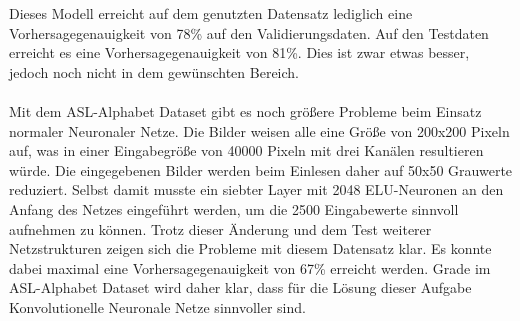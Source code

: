 \documentclass[11pt,bibliography=totocnumbered]{scrartcl}
\begin{document}
\vspace*{-5mm}
Dieses Modell erreicht auf dem genutzten Datensatz lediglich eine Vorhersagegenauigkeit von 78\% auf den Validierungsdaten. Auf den Testdaten erreicht es eine Vorhersagegenauigkeit von 81\%. Dies ist zwar etwas besser, jedoch noch nicht in dem gewünschten Bereich.
\\\\
Mit dem ASL-Alphabet Dataset gibt es noch größere Probleme beim Einsatz normaler Neuronaler Netze. Die Bilder weisen alle eine Größe von 200x200 Pixeln auf, was in einer Eingabegröße von 40000 Pixeln mit drei Kanälen resultieren würde. Die eingegebenen Bilder werden beim Einlesen daher auf 50x50 Grauwerte reduziert. Selbst damit musste ein siebter Layer mit 2048 ELU-Neuronen an den Anfang des Netzes eingeführt werden, um die 2500 Eingabewerte sinnvoll aufnehmen zu können. Trotz dieser Änderung und dem Test weiterer Netzstrukturen zeigen sich die Probleme mit diesem Datensatz klar. Es konnte dabei maximal eine Vorhersagegenauigkeit von 67\% erreicht werden. Grade im ASL-Alphabet Dataset wird daher klar, dass für die Lösung dieser Aufgabe Konvolutionelle Neuronale Netze sinnvoller sind.
\end{document}

